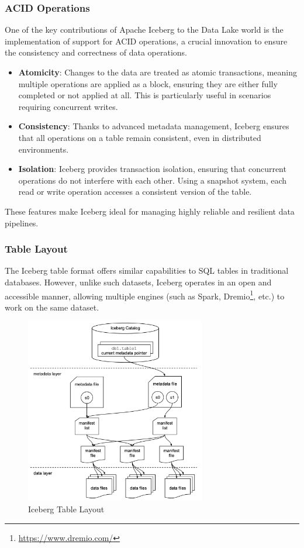 \subsubsection{ACID Operations}

One of the key contributions of Apache Iceberg to the Data Lake world is the implementation of support for \ac{ACID} operations, a crucial innovation to ensure the consistency and correctness of data operations.

\begin{itemize}
    \item \textbf{Atomicity}: Changes to the data are treated as atomic transactions, meaning multiple operations are applied as a block, ensuring they are either fully completed or not applied at all. This is particularly useful in scenarios requiring concurrent writes.
    \item \textbf{Consistency}: Thanks to advanced metadata management, Iceberg ensures that all operations on a table remain consistent, even in distributed environments.
    \item \textbf{Isolation}: Iceberg provides transaction isolation, ensuring that concurrent operations do not interfere with each other. Using a snapshot system, each read or write operation accesses a consistent version of the table.
\end{itemize}

These features make Iceberg ideal for managing highly reliable and resilient data pipelines.

\subsubsection{Table Layout}

The Iceberg table format offers similar capabilities to \ac{SQL} tables in traditional databases. However, unlike such datasets, Iceberg operates in an open and accessible manner, allowing multiple engines (such as Spark, Dremio\footnote{\url{https://www.dremio.com/}}, etc.) to work on the same dataset.

\begin{figure}[H]
    \centering
    \includegraphics[width=0.7\textwidth]{res/IcebergFileLayout.png}
    \caption{Iceberg Table Layout}
    \label{fig:iceberglayout}
\end{figure}

